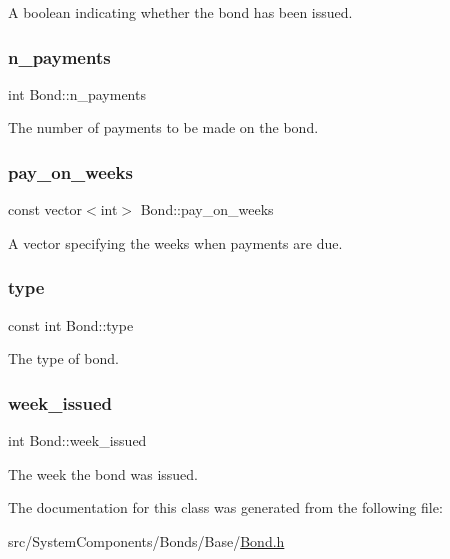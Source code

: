A boolean indicating whether the bond has been issued. 

\mbox{\label{classBond_a4a227b6de2eeada118d82ab1633b1db8}} 
\subsubsection{\texorpdfstring{n\+\_\+payments}{n\_payments}}
{\footnotesize\ttfamily int Bond\+::n\+\_\+payments\hspace{0.3cm}{\ttfamily [protected]}}



The number of payments to be made on the bond. 

\mbox{\label{classBond_ae8dd46fcbf95c993460ffe4ea1f52739}} 
\subsubsection{\texorpdfstring{pay\+\_\+on\+\_\+weeks}{pay\_on\_weeks}}
{\footnotesize\ttfamily const vector$<$int$>$ Bond\+::pay\+\_\+on\+\_\+weeks}



A vector specifying the weeks when payments are due. 

\mbox{\label{classBond_a48da24878beedd71cbaa990cea860667}} 
\subsubsection{\texorpdfstring{type}{type}}
{\footnotesize\ttfamily const int Bond\+::type}



The type of bond. 

\mbox{\label{classBond_a30d48d158cbbd9c7b4bfa0012c89590a}} 
\subsubsection{\texorpdfstring{week\+\_\+issued}{week\_issued}}
{\footnotesize\ttfamily int Bond\+::week\+\_\+issued\hspace{0.3cm}{\ttfamily [protected]}}



The week the bond was issued. 



The documentation for this class was generated from the following file\+:\begin{DoxyCompactItemize}
\item 
src/\+System\+Components/\+Bonds/\+Base/\mbox{\hyperlink{Bond_8h}{Bond.\+h}}\end{DoxyCompactItemize}

